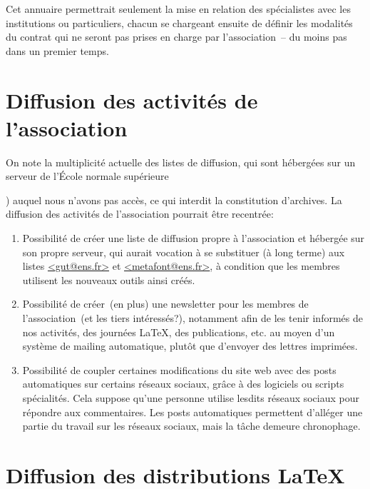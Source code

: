 \documentclass{tufte-handout}
\newcommand{\ratio}[3][]{\marginpar{\footnotesize{\textcolor{teal}{Temps requis: #2 / Utilité: #3}\par\noindent \textcolor{teal}{#1}}}}
\begin{document}
Cet annuaire permettrait seulement la mise en relation des spécialistes avec les institutions ou particuliers, chacun se chargeant ensuite de définir les modalités du contrat qui ne seront pas prises en charge par l'association~-- du moins pas dans un premier temps.


\section{Diffusion des activités de l'association}

On note la multiplicité actuelle des listes de diffusion, qui sont hébergées sur un serveur de l'École normale supérieure~{) auquel nous n'avons pas accès, ce qui interdit la constitution d'archives. La diffusion des activités de l'association pourrait être recentrée:

\begin{enumerate}
	\item Possibilité de créer\ratio[Simple, mais \emph{quid} de l'efficacité]{+}{+} une liste de diffusion propre à l'association et hébergée sur son propre serveur, qui aurait vocation à se substituer (à long terme) aux listes \url{<gut@ens.fr>} et \url{<metafont@ens.fr>}, à condition que les membres utilisent les nouveaux outils ainsi créés.
	\item Possibilité de créer~(en plus) une newsletter\ratio[Simple et utile pour toucher davantage d'utilisateurs]{+}{++} pour les membres de l'association~(et les tiers intéressés?), notamment afin de les tenir informés de nos activités, des journées \LaTeX, des publications, etc. au moyen d'un système de mailing automatique, plutôt que d'envoyer des lettres imprimées.
	\item Possibilité de coupler certaines modifications\ratio[Atteindre de nouveaux publics, mais ces médias correspondent-ils à notre philosophie?]{++}{+} du site web avec des posts automatiques sur certains réseaux sociaux, grâce à des logiciels ou scripts spécialités. Cela suppose qu'une personne utilise lesdits réseaux sociaux pour répondre aux commentaires. Les posts automatiques permettent d'alléger une partie du travail sur les réseaux sociaux, mais la tâche demeure chronophage.
\end{enumerate}


\section{Diffusion des distributions \LaTeX}

}
\end{document}
